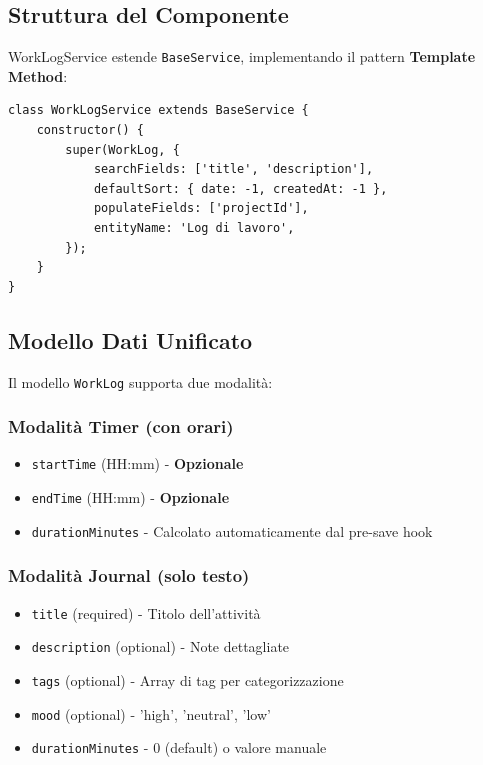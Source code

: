 \documentclass[11pt,a4paper]{article}
\begin{document}
\subsection{Struttura del Componente}

WorkLogService estende \texttt{BaseService}, implementando il pattern \textbf{Template Method}:

\begin{lstlisting}[caption=Costruttore WorkLogService]
class WorkLogService extends BaseService {
    constructor() {
        super(WorkLog, {
            searchFields: ['title', 'description'],
            defaultSort: { date: -1, createdAt: -1 },
            populateFields: ['projectId'],
            entityName: 'Log di lavoro',
        });
    }
}
\end{lstlisting}

\subsection{Modello Dati Unificato}

Il modello \texttt{WorkLog} supporta due modalità:

\subsubsection{Modalità Timer (con orari)}
\begin{itemize}
    \item \texttt{startTime} (HH:mm) - \textbf{Opzionale}
    \item \texttt{endTime} (HH:mm) - \textbf{Opzionale}
    \item \texttt{durationMinutes} - Calcolato automaticamente dal pre-save hook
\end{itemize}

\subsubsection{Modalità Journal (solo testo)}
\begin{itemize}
    \item \texttt{title} (required) - Titolo dell'attività
    \item \texttt{description} (optional) - Note dettagliate
    \item \texttt{tags} (optional) - Array di tag per categorizzazione
    \item \texttt{mood} (optional) - 'high', 'neutral', 'low'
    \item \texttt{durationMinutes} - 0 (default) o valore manuale
\end{itemize}
\end{document}
